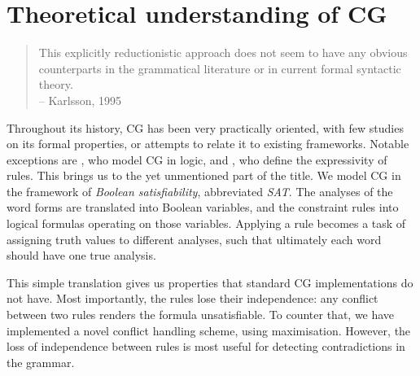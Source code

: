 

\section{Theoretical understanding of CG}

\begin{quote}
This explicitly reductionistic approach does not seem to have any obvious counterparts in the grammatical literature or in current formal syntactic theory. \\
-- Karlsson, 1995
\end{quote}

Throughout its history, CG has been very practically oriented, with 
few studies on its formal properties, or attempts to relate it to existing
frameworks.
Notable exceptions are \cite{lager_nivre01}, who model CG in logic, and 
\cite{tapanainen1999phd}, who define the expressivity of rules.
This brings us to the yet unmentioned part of the title.
We model CG in the framework of \emph{Boolean satisfiability}, abbreviated \emph{SAT}.
The analyses of the word forms are translated into Boolean variables, 
and the constraint rules into logical formulas operating on those variables.
Applying a rule becomes a task of assigning truth values to different analyses,
such that ultimately each word should have one true analysis.

This simple translation gives us properties that standard CG implementations do not have.
Most importantly, the rules lose their independence: any conflict between two rules renders the formula unsatisfiable. To counter that, we have implemented a novel conflict handling scheme, using maximisation. However, the loss of independence between rules is most useful for detecting contradictions in the grammar.




